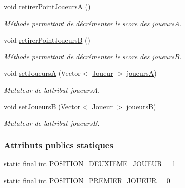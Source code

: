\begin{DoxyCompactItemize}
\item 
void \hyperlink{classcom_1_1example_1_1area_1_1_partie_a2847b07aff035a02c130f6219efc5312}{retirer\+Point\+JoueursA} ()
\begin{DoxyCompactList}\small\item\em Méthode permettant de décrémenter le score des joueursA. \end{DoxyCompactList}\item 
void \hyperlink{classcom_1_1example_1_1area_1_1_partie_aa3f7d2c68dcf31a2e48f95c5db9c5663}{retirer\+Point\+JoueursB} ()
\begin{DoxyCompactList}\small\item\em Méthode permettant de décrémenter le score des joueursB. \end{DoxyCompactList}\item 
void \hyperlink{classcom_1_1example_1_1area_1_1_partie_ace9c70bf0685d426f0d3fdb7e4f81f3f}{set\+JoueursA} (Vector$<$ \hyperlink{classcom_1_1example_1_1area_1_1_joueur}{Joueur} $>$ \hyperlink{classcom_1_1example_1_1area_1_1_partie_a190a033a96ec435589ac53f78d60890b}{joueursA})
\begin{DoxyCompactList}\small\item\em Mutateur de l\textquotesingle{}attribut joueursA. \end{DoxyCompactList}\item 
void \hyperlink{classcom_1_1example_1_1area_1_1_partie_a3f3cc9b2ddd055945b8b0835d0e7466b}{set\+JoueursB} (Vector$<$ \hyperlink{classcom_1_1example_1_1area_1_1_joueur}{Joueur} $>$ \hyperlink{classcom_1_1example_1_1area_1_1_partie_a208910b83df461c3a2503f3b28650ce8}{joueursB})
\begin{DoxyCompactList}\small\item\em Mutateur de l\textquotesingle{}attribut joueursB. \end{DoxyCompactList}\end{DoxyCompactItemize}
\subsubsection*{Attributs publics statiques}
\begin{DoxyCompactItemize}
\item 
static final int \hyperlink{classcom_1_1example_1_1area_1_1_partie_a6b5837dffa2af6a8da369f69916498f4}{P\+O\+S\+I\+T\+I\+O\+N\+\_\+\+D\+E\+U\+X\+I\+E\+M\+E\+\_\+\+J\+O\+U\+E\+UR} = 1
\item 
static final int \hyperlink{classcom_1_1example_1_1area_1_1_partie_a2f977d38424ff199a053d9e3cd4eb8c6}{P\+O\+S\+I\+T\+I\+O\+N\+\_\+\+P\+R\+E\+M\+I\+E\+R\+\_\+\+J\+O\+U\+E\+UR} = 0
\end{DoxyCompactItemize}
